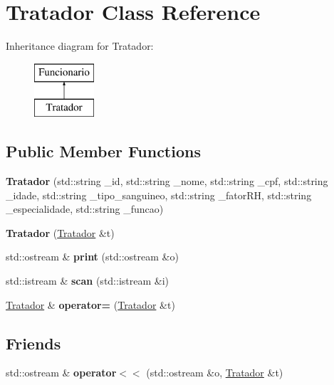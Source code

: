 \hypertarget{classTratador}{}\section{Tratador Class Reference}
\label{classTratador}
Inheritance diagram for Tratador\+:\begin{figure}[H]
\begin{center}
\leavevmode
\includegraphics[height=2.000000cm]{classTratador}
\end{center}
\end{figure}
\subsection*{Public Member Functions}
\begin{DoxyCompactItemize}
\item 
\mbox{\label{classTratador_ad9e8333c7fb8b232c89744036d08a254}} 
{\bfseries Tratador} (std\+::string \+\_\+id, std\+::string \+\_\+nome, std\+::string \+\_\+cpf, std\+::string \+\_\+idade, std\+::string \+\_\+tipo\+\_\+sanguineo, std\+::string \+\_\+fator\+RH, std\+::string \+\_\+especialidade, std\+::string \+\_\+funcao)
\item 
\mbox{\label{classTratador_a835c33d9d4451f425e0dd9e083ee104e}} 
{\bfseries Tratador} (\hyperlink{classTratador}{Tratador} \&t)
\item 
\mbox{\label{classTratador_a21e41c2e6c02a0223af74f5c10ca352f}} 
std\+::ostream \& {\bfseries print} (std\+::ostream \&o)
\item 
\mbox{\label{classTratador_a336550a0c12a4db6f02d6246beb7440b}} 
std\+::istream \& {\bfseries scan} (std\+::istream \&i)
\item 
\mbox{\label{classTratador_aa8dd71720d4b5eaef8fb6dd7f6bb485c}} 
\hyperlink{classTratador}{Tratador} \& {\bfseries operator=} (\hyperlink{classTratador}{Tratador} \&t)
\end{DoxyCompactItemize}
\subsection*{Friends}
\begin{DoxyCompactItemize}
\item 
\mbox{\label{classTratador_a80d2acf043be5b18ff7f049821326d3a}} 
std\+::ostream \& {\bfseries operator$<$$<$} (std\+::ostream \&o, \hyperlink{classTratador}{Tratador} \&t)
\end{DoxyCompactItemize}

